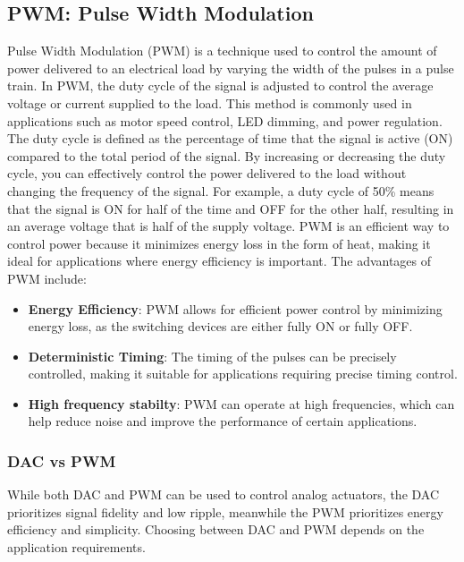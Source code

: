 \subsection{PWM: Pulse Width Modulation}
Pulse Width Modulation (PWM) is a technique used to control the amount of power
delivered to an electrical load by varying the width of the pulses in a pulse
train. In PWM, the duty cycle of the signal is adjusted to control the average
voltage or current supplied to the load. This method is commonly used in
applications such as motor speed control, LED dimming, and power regulation.
The duty cycle is defined as the percentage of time that the signal is active
(ON) compared to the total period of the signal. By increasing or decreasing
the duty cycle, you can effectively control the power delivered to the load
without changing the frequency of the signal. For example, a duty cycle of 50\%
means that the signal is ON for half of the time and OFF for the other half,
resulting in an average voltage that is half of the supply voltage. PWM is an
efficient way to control power because it minimizes energy loss in the form of
heat, making it ideal for applications where energy efficiency is important.
The advantages of PWM include:
\begin{itemize}
    \item \textbf{Energy Efficiency}: PWM allows for efficient power control by
          minimizing energy loss, as the switching devices are either fully ON
          or fully OFF.
    \item \textbf{Deterministic Timing}: The timing of the pulses can be
          precisely controlled, making it suitable for applications requiring
          precise timing control.
    \item \textbf{High frequency stabilty}: PWM can operate at high frequencies,
          which can help reduce noise and improve the performance of certain
          applications.
\end{itemize}
\subsubsection{DAC vs PWM}
While both DAC and PWM can be used to control analog actuators, the DAC
prioritizes signal fidelity and low ripple, meanwhile the PWM prioritizes
energy efficiency and simplicity. Choosing between DAC and PWM depends on the
application requirements.
